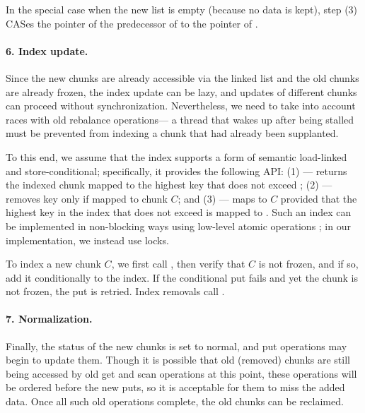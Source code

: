 In the special case when the new list is empty (because no data is kept), step (3) CASes  the  pointer of the predecessor of  to the   pointer of .

\paragraph{6. Index update.}

Since the new chunks are already accessible via the linked list and the old chunks are already frozen, the index update can be lazy, and updates of different chunks can proceed without synchronization.
Nevertheless, we need to take into account races with old rebalance operations--- a thread that wakes up after being stalled must be prevented from indexing a chunk that had already been supplanted.

To this end, we assume that the index supports a form of semantic load-linked and store-conditional; specifically, it provides the following API:
(1)  --- returns the indexed chunk mapped to the highest key that does not exceed ;
(2)  --- removes key  only if mapped to chunk $C$; and
(3)  --- maps  to $C$ provided that the highest key in the index that does not exceed
 is mapped to .
Such an index can be implemented in non-blocking ways using low-level atomic operations \cite{BraginskyP2012}; in our implementation,
we instead use locks.

To index a new chunk $C$, we first call , then verify that $C$ is not frozen, and if so,
add it conditionally to the index. If the conditional put fails and yet the chunk is not frozen, the put is retried.
Index removals call .

\paragraph{7. Normalization.}
Finally, the status of the new chunks is set to normal, and put operations may begin to update them.
Though it is possible that old (removed) chunks are still being accessed by old get and scan operations at this point, these operations will
be ordered before the new puts, so it is acceptable for them to miss the added data. Once all such old operations complete, the
old chunks can be reclaimed.

